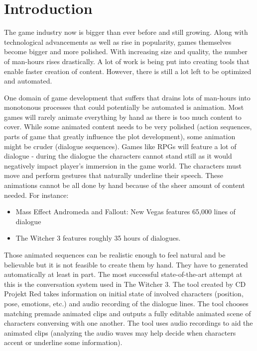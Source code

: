 \chapter{Introduction\label{chap:introduction}}

The game industry now is bigger than ever before and still growing. Along with technological advancements as well as rise in popularity, games themselves become bigger and more polished. With increasing size and quality, the number of man-hours rises drastically. A lot of work is being put into creating tools that enable faster creation of content. However, there is still a lot left to be optimized and automated.

One domain of game development that suffers that drains lots of man-hours into monotonous processes that could potentially be automated is animation. Most games will rarely animate everything by hand as there is too much content to cover. While some animated content needs to be very polished (action sequences, parts of game that greatly influence the plot development), some animation might be cruder (dialogue sequences). Games like RPGs will feature a lot of dialogue - during the dialogue the characters cannot stand still as it would negatively impact player's immersion in the game world. The characters must move and perform gestures that naturally underline their speech. These animations cannot be all done by hand because of the sheer amount of content needed. For instance:

\begin{itemize}
\item Mass Effect Andromeda and Fallout:  New Vegas features 65,000 lines of dialogue

\item The Witcher 3 features roughly 35 hours of dialogues.

\end{itemize}

Those animated sequences can be realistic enough to feel natural and be believable but it is not feasible to create them by hand. They have to generated automatically at least in part. The most successful state-of-the-art attempt at this is the conversation system used in The Witcher 3. The tool created by CD Projekt Red takes information on initial state of involved characters (position, pose, emotions, etc.) and audio recording of the dialogue lines. The tool chooses matching premade animated clips and outputs a fully editable animated scene of characters conversing with one another. The tool uses audio recordings to aid the animated clips (analyzing the audio waves may help decide when characters accent or underline some information).

